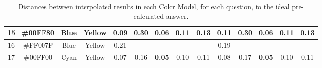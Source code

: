 \begin{table}[!htbp]
{\begin{tabular}{@{}cccccccccccccc@{}}
    \multicolumn{1}{c}{15}      & \multicolumn{1}{c}{\cellcolor[HTML]{00FF80}\#00FF80} & \multicolumn{1}{c|}{Blue}    & \multicolumn{1}{c|}{Yellow}  & \multicolumn{1}{c|}{0.09}                                   & \multicolumn{1}{c|}{0.30}                                  & \multicolumn{1}{c|}{\cellcolor[HTML]{32CB00}\textbf{0.06}} & \multicolumn{1}{c|}{0.11}  & \multicolumn{1}{c||}{0.13}                                  & \multicolumn{1}{c|}{0.11}                                  & \multicolumn{1}{c|}{0.30}                                  & \multicolumn{1}{c|}{\cellcolor[HTML]{32CB00}\textbf{0.06}} & \multicolumn{1}{c|}{0.11}                                  & \multicolumn{1}{c|}{0.13}                                  \\ \midrule
    \multicolumn{1}{c}{16}      & \multicolumn{1}{c}{\cellcolor[HTML]{FF007F}\#FF007F} & \multicolumn{1}{c|}{Blue}    & \multicolumn{1}{c|}{Yellow}  & \multicolumn{1}{c|}{0.21}                                   & \multicolumn{4}{c||}{}                                                                                                                                                                                             & \multicolumn{1}{c|}{0.19}                                  & \multicolumn{4}{c|}{}                                                                                                                                                                                                                             \\ \midrule
    \multicolumn{1}{c}{17}      & \multicolumn{1}{c}{\cellcolor[HTML]{00FF00}\#00FF00} & \multicolumn{1}{c|}{Cyan}    & \multicolumn{1}{c|}{Yellow}  & \multicolumn{1}{c|}{0.07}                                   & \multicolumn{1}{c|}{0.16}                                  & \multicolumn{1}{c|}{\cellcolor[HTML]{32CB00}\textbf{0.05}} & \multicolumn{1}{c|}{0.10}  & \multicolumn{1}{c||}{0.11}                                  & \multicolumn{1}{c|}{0.08}                                  & \multicolumn{1}{c|}{0.17}                                  & \multicolumn{1}{c|}{\cellcolor[HTML]{32CB00}\textbf{0.05}} & \multicolumn{1}{c|}{0.10}                                  & \multicolumn{1}{c|}{0.11}                                  \\ \bottomrule
  \end{tabular}}
  \caption[Distances of Results Interpolated in each Color Model]{Distances between interpolated results in each Color Model, for each question, to the ideal pre-calculated answer.}
  \label{table:colormodels_distances_labonline}
\end{table}
